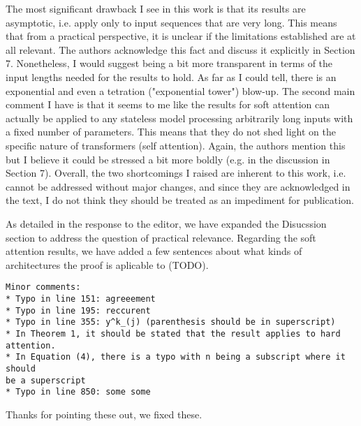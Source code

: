 \documentclass[11pt,a4paper]{article}
\newcommand\response[1]{{\color{blue}#1}}
\begin{document}
The most significant drawback I see in this work is that its results are
asymptotic, i.e. apply only to input sequences that are very long.  This
means that from a practical perspective, it is unclear if the limitations
established are at all relevant.  The authors acknowledge this fact and
discuss it explicitly in Section 7.  Nonetheless, I would suggest being a
bit more transparent in terms of the input lengths needed for the results to
hold.  As far as I could tell, there is an exponential and even a tetration
("exponential tower") blow-up.  The second main comment I have is that it
seems to me like the results for soft attention can actually be applied to
any stateless model processing arbitrarily long inputs with a fixed number
of parameters.  This means that they do not shed light on the specific
nature of transformers (self attention).  Again, the authors mention this
but I believe it could be stressed a bit more boldly (e.g. in the discussion
in Section 7).  Overall, the two shortcomings I raised are inherent to this
work, i.e. cannot be addressed without major changes, and since they are
acknowledged in the text, I do not think they should be treated as an
impediment for publication.

\response{As detailed in the response to the editor, we have expanded the Disucssion section to address the question of practical relevance. Regarding the soft attention results, we have added a few sentences about what kinds of architectures the proof is aplicable to (TODO).}

\begin{verbatim}
Minor comments:
* Typo in line 151: agreeement
* Typo in line 195: reccurent
* Typo in line 355: y^k_(j) (parenthesis should be in superscript)
* In Theorem 1, it should be stated that the result applies to hard
attention.
* In Equation (4), there is a typo with n being a subscript where it should
be a superscript
* Typo in line 850: some some
\end{verbatim}

\response{Thanks for pointing these out, we fixed these.}
\end{document}
